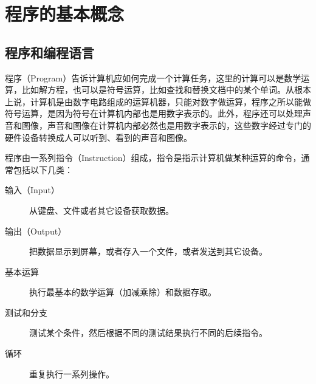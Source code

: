 

\chapter{程序的基本概念}
%





\section{程序和编程语言}
%
程序（Program）告诉计算机应如何完成一个计算任务，这里的计算可以是数学运算，比如解方程，也可以是符号运算，比如查找和替换文档中的某个单词。从根本上说，计算机是由数字电路组成的运算机器，只能对数字做运算，程序之所以能做符号运算，是因为符号在计算机内部也是用数字表示的。此外，程序还可以处理声音和图像，声音和图像在计算机内部必然也是用数字表示的，这些数字经过专门的硬件设备转换成人可以听到、看到的声音和图像。



程序由一系列指令（Instruction）组成，指令是指示计算机做某种运算的命令，通常包括以下几类：


\begin{description}
\item[{输入（Input）}]


从键盘、文件或者其它设备获取数据。

\item[{输出（Output）}]


把数据显示到屏幕，或者存入一个文件，或者发送到其它设备。

\item[{基本运算}]


执行最基本的数学运算（加减乘除）和数据存取。

\item[{测试和分支}]


测试某个条件，然后根据不同的测试结果执行不同的后续指令。

\item[{循环}]


重复执行一系列操作。


\end{description}


